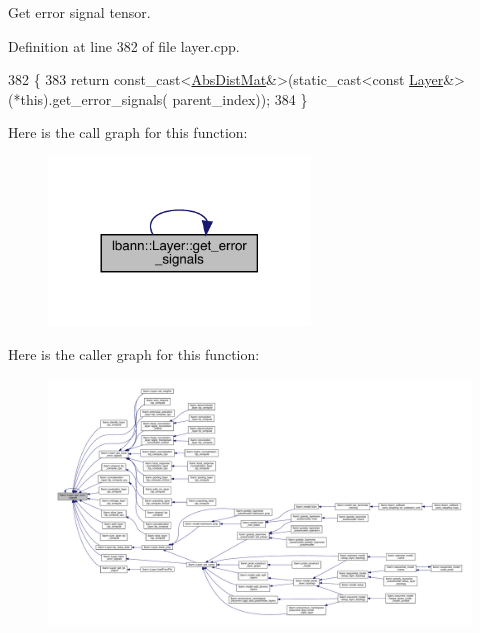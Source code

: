 Get error signal tensor. 

Definition at line 382 of file layer.\+cpp.


\begin{DoxyCode}
382                                                      \{
383   \textcolor{keywordflow}{return} \textcolor{keyword}{const\_cast<}\hyperlink{base_8hpp_a9a697a504ae84010e7439ffec862b470}{AbsDistMat}&\textcolor{keyword}{>}(\textcolor{keyword}{static\_cast<}\textcolor{keyword}{const }\hyperlink{classlbann_1_1Layer_a24e9c82354a0a2af1b70cbca2211e7d4}{Layer}&\textcolor{keyword}{>}(*this).get\_error\_signals(
      parent\_index));
384 \}
\end{DoxyCode}
Here is the call graph for this function\+:\nopagebreak
\begin{figure}[H]
\begin{center}
\leavevmode
\includegraphics[width=197pt]{classlbann_1_1Layer_adb561e140e0bb601f3c5a8ee053a71d2_cgraph}
\end{center}
\end{figure}
Here is the caller graph for this function\+:\nopagebreak
\begin{figure}[H]
\begin{center}
\leavevmode
\includegraphics[width=350pt]{classlbann_1_1Layer_adb561e140e0bb601f3c5a8ee053a71d2_icgraph}
\end{center}
\end{figure}
\mbox{\label{classlbann_1_1Layer_ae09bc5a240e9042371203ba5ff19990c}} 
